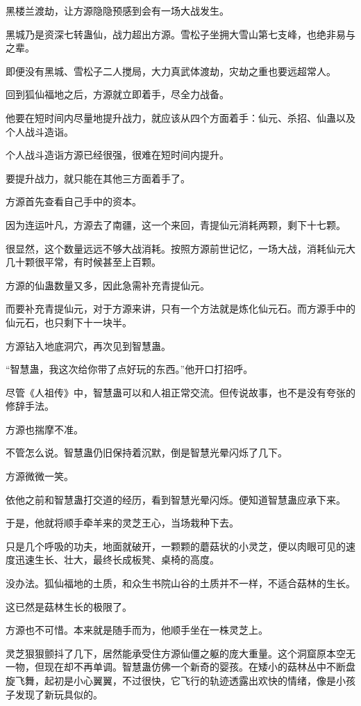 
\begin{this_body}

黑楼兰渡劫，让方源隐隐预感到会有一场大战发生。

黑城乃是资深七转蛊仙，战力超出方源。雪松子坐拥大雪山第七支峰，也绝非易与之辈。

即便没有黑城、雪松子二人搅局，大力真武体渡劫，灾劫之重也要远超常人。

回到狐仙福地之后，方源就立即着手，尽全力战备。

他要在短时间内尽量地提升战力，就应该从四个方面着手：仙元、杀招、仙蛊以及个人战斗造诣。

个人战斗造诣方源已经很强，很难在短时间内提升。

要提升战力，就只能在其他三方面着手了。

方源首先查看自己手中的资本。

因为连运叶凡，方源去了南疆，这一个来回，青提仙元消耗两颗，剩下十七颗。

很显然，这个数量远远不够大战消耗。按照方源前世记忆，一场大战，消耗仙元大几十颗很平常，有时候甚至上百颗。

方源的仙蛊数量又多，因此急需补充青提仙元。

而要补充青提仙元，对于方源来讲，只有一个方法就是炼化仙元石。而方源手中的仙元石，也只剩下十一块半。

方源钻入地底洞穴，再次见到智慧蛊。

“智慧蛊，我这次给你带了点好玩的东西。”他开口打招呼。

尽管《人祖传》中，智慧蛊可以和人祖正常交流。但传说故事，也不是没有夸张的修辞手法。

方源也揣摩不准。

不管怎么说。智慧蛊仍旧保持着沉默，倒是智慧光晕闪烁了几下。

方源微微一笑。

依他之前和智慧蛊打交道的经历，看到智慧光晕闪烁。便知道智慧蛊应承下来。

于是，他就将顺手牵羊来的灵芝王心，当场栽种下去。

只是几个呼吸的功夫，地面就破开，一颗颗的蘑菇状的小灵芝，便以肉眼可见的速度迅速生长、壮大，最终长成板凳、桌椅的高度。

没办法。狐仙福地的土质，和众生书院山谷的土质并不一样，不适合菇林的生长。

这已然是菇林生长的极限了。

方源也不可惜。本来就是随手而为，他顺手坐在一株灵芝上。

灵芝狠狠颤抖了几下，居然能承受住方源仙僵之躯的庞大重量。这个洞窟原本空无一物，但现在却不再单调。智慧蛊仿佛一个新奇的婴孩。在矮小的菇林丛中不断盘旋飞舞，起初是小心翼翼，不过很快，它飞行的轨迹透露出欢快的情绪，像是小孩子发现了新玩具似的。


\end{this_body}

